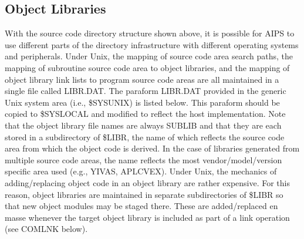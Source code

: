 \subsection{Object Libraries}
With the source code directory structure shown above, it is possible
for AIPS to use different parts of the directory infrastructure with
different operating systems and peripherals.  Under Unix, the mapping
of source code area search paths, the mapping of subroutine source
code area to object libraries, and the mapping of object library link
lists to program source code areas are all maintained in a single file
called LIBR.DAT.  The paraform LIBR.DAT provided in the generic Unix
system area (i.e., \$SYSUNIX) is listed below.  This paraform should
be copied to \$SYSLOCAL and modified to reflect the host
implementation.  Note that the object library file names are always
SUBLIB and that they are each stored in a subdirectory of \$LIBR, the
name of which reflects the source code area from which the object code
is derived.  In the case of libraries generated from multiple source
code areas, the name reflects the most vendor/model/version specific
area used (e.g., YIVAS, APLCVEX).  Under Unix, the mechanics of
adding/replacing object code in an object library are rather
expensive.  For this reason, object libraries are maintained in
separate subdirectories of \$LIBR so that new object modules may be
staged there.  These are added/replaced en masse whenever the target
object library is included as part of a link operation (see COMLNK
below).

